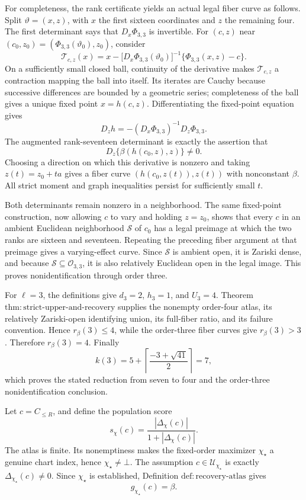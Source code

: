 For completeness, the rank certificate yields an actual legal fiber curve as follows.  Split \(\vartheta=(x,z)\), with \(x\) the first sixteen coordinates and \(z\) the remaining four.  The first determinant says that \(D_x\Phi_{3,3}\) is invertible.  For \((c,z)\) near \((c_0,z_0)=(\Phi_{3,3}(\vartheta_0),z_0)\), consider
\[
 \mathcal T_{c,z}(x)=x-\bigl[D_x\Phi_{3,3}(\vartheta_0)\bigr]^{-1}
       \{\Phi_{3,3}(x,z)-c\}.
\]
On a sufficiently small closed ball, continuity of the derivative makes \(\mathcal T_{c,z}\) a contraction mapping the ball into itself.  Its iterates are Cauchy because successive differences are bounded by a geometric series; completeness of the ball gives a unique fixed point \(x=h(c,z)\).  Differentiating the fixed-point equation gives
\[
 D_zh=-(D_x\Phi_{3,3})^{-1}D_z\Phi_{3,3}.
\]
The augmented rank-seventeen determinant is exactly the assertion that
\[
 D_z\{\beta(h(c_0,z),z)\}\ne0.
\]
Choosing a direction on which this derivative is nonzero and taking \(z(t)=z_0+ta\) gives a fiber curve \((h(c_0,z(t)),z(t))\) with nonconstant \(\beta\).  All strict moment and graph inequalities persist for sufficiently small \(t\).

Both determinants remain nonzero in a neighborhood.  The same fixed-point construction, now allowing \(c\) to vary and holding \(z=z_0\), shows that every \(c\) in an ambient Euclidean neighborhood \(\mathcal S\) of \(c_0\) has a legal preimage at which the two ranks are sixteen and seventeen.  Repeating the preceding fiber argument at that preimage gives a varying-effect curve.  Since \(\mathcal S\) is ambient open, it is Zariski dense, and because \(\mathcal S\subseteq\mathcal O_{3,3}\), it is also relatively Euclidean open in the legal image.  This proves nonidentification through order three.

For \(\ell=3\), the definitions give \(d_3=2\), \(h_3=1\), and \(U_3=4\).  Theorem \(\mathrm{thm:strict\mbox{-}upper\mbox{-}and\mbox{-}recovery}\) supplies the nonempty order-four atlas, its relatively Zariski-open identifying union, its full-fiber ratio, and its failure convention.  Hence \(r_\beta(3)\le4\), while the order-three fiber curves give \(r_\beta(3)>3\).  Therefore \(r_\beta(3)=4\).  Finally
\[
 k(3)=5+\left\lceil\frac{-3+\sqrt{41}}2\right\rceil=7,
\]
which proves the stated reduction from seven to four and the order-three nonidentification conclusion.

Let \(c=C_{\le R}\), and define the population score
\[
 s_\chi(c)=\frac{|\Delta_\chi(c)|}{1+|\Delta_\chi(c)|}.
\]
The atlas is finite.  Its nonemptiness makes the fixed-order maximizer \(\chi_\star\) a genuine chart index, hence \(\chi_\star\ne\bot\).  The assumption \(c\in\mathcal U_{\chi_\star}\) is exactly \(\Delta_{\chi_\star}(c)\ne0\).  Since \(\chi_\star\) is established, Definition \(\mathrm{def:recovery\mbox{-}atlas}\) gives
\[
 g_{\chi_\star}(c)=\beta.
\]

